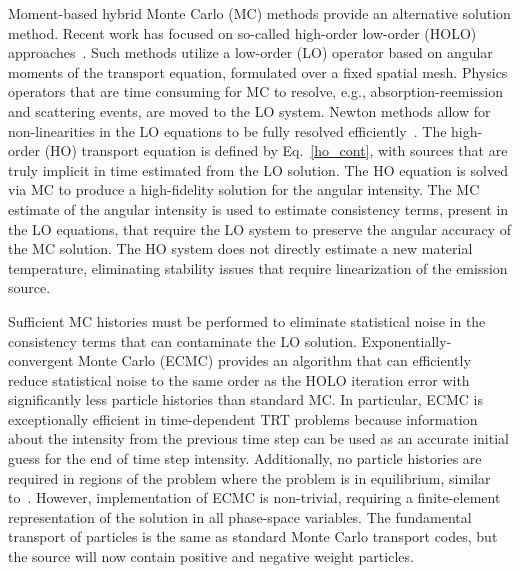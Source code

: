\documentclass{mc2013}
\begin{document}
Moment-based hybrid Monte Carlo (MC) methods provide an alternative solution method.
Recent work has focused on so-called high-order low-order (HOLO)
approaches~\cite{willert,park,rmc,ans_2014}.  Such methods utilize a low-order (LO)
operator based on angular moments of the transport equation, formulated over a fixed
spatial mesh. Physics operators that are time consuming for MC
to resolve, e.g., absorption-reemission and scattering events, are moved to the LO
system.  Newton methods allow for non-linearities in the LO equations to be fully
resolved efficiently~\cite{willert}.  The high-order (HO) transport equation is defined by 
Eq.~\eqref{ho_cont}, with sources that are truly implicit in time estimated from the LO solution. The HO equation is solved via MC to produce a high-fidelity solution for
the angular intensity.  The MC estimate of the angular intensity is used to estimate consistency terms,
present in the LO equations, that require the LO system to preserve the angular accuracy of the
MC solution.  The HO system does not directly estimate a new material temperature,
eliminating stability issues that require linearization of the emission source.

Sufficient MC histories must be performed to eliminate statistical
noise in the consistency terms that can contaminate the LO solution.
Exponentially-convergent Monte Carlo (ECMC)\cite{ecmc} provides an algorithm that can efficiently
reduce statistical noise to the same order as the HOLO iteration error with
significantly less particle histories than standard MC. In particular, ECMC is
exceptionally efficient in time-dependent TRT problems because information about the
intensity from the previous time step can be used as an accurate initial guess for
the end of time step intensity. Additionally, no particle histories are required in regions of the problem
where the problem is in equilibrium, similar to~\cite{rmc}.  However, implementation
of ECMC is non-trivial, requiring a finite-element representation of the solution in all
phase-space variables.  The fundamental transport of particles is the same
as standard Monte Carlo transport codes, but the source will now contain positive and
negative weight particles.
\end{document}
